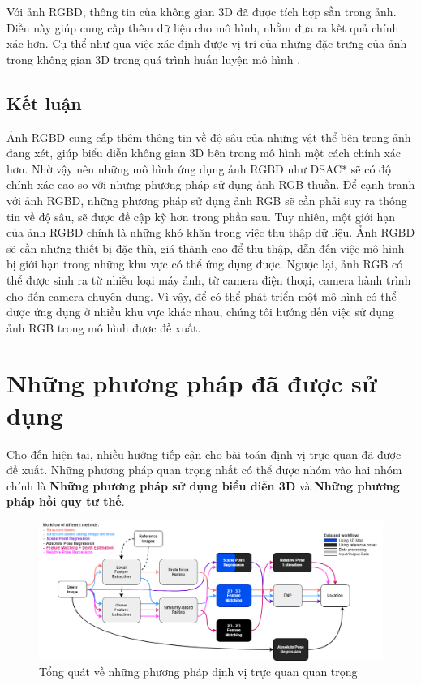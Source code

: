 Với ảnh RGBD, thông tin của không gian 3D đã được tích hợp sẵn trong ảnh. Điều này giúp cung cấp thêm dữ liệu cho mô hình, nhằm đưa ra kết quả chính xác hơn. Cụ thể như qua việc xác định được vị trí của những đặc trưng của ảnh trong không gian 3D trong quá trình huấn luyện mô hình \cite{brachmann2021visual,arnold2022mapfree}.


\subsection{Kết luận}
Ảnh RGBD cung cấp thêm thông tin về độ sâu của những vật thể bên trong ảnh đang xét, giúp biểu diễn không gian 3D bên trong mô hình một cách chính xác hơn. Nhờ vậy nên những mô hình ứng dụng ảnh RGBD như DSAC* \cite{brachmann2021visual} sẽ có độ chính xác cao so với những phương pháp sử dụng ảnh RGB thuần. Để cạnh tranh với ảnh RGBD, những phương pháp sử dụng ảnh RGB sẽ cần phải suy ra thông tin về độ sâu, sẽ được đề cập kỹ hơn trong phần sau. Tuy nhiên, một giới hạn của ảnh RGBD chính là những khó khăn trong việc thu thập dữ liệu. Ảnh RGBD sẽ cần những thiết bị đặc thù, giá thành cao để thu thập, dẫn đến việc mô hình bị giới hạn trong những khu vực có thể ứng dụng được. Ngược lại, ảnh RGB có thể được sinh ra từ nhiều loại máy ảnh, từ camera điện thoại, camera hành trình cho đến camera chuyên dụng. Vì vậy, để có thể phát triển một mô hình có thể được ứng dụng ở nhiều khu vực khác nhau, chúng tôi hướng đến việc sử dụng ảnh RGB trong mô hình được đề xuất.

\section{Những phương pháp đã được sử dụng}

Cho đến hiện tại, nhiều hướng tiếp cận cho bài toán định vị trực quan đã được đề xuất. Những phương pháp quan trọng nhất có thể được nhóm vào hai nhóm chính là \textbf{Những phương pháp sử dụng biểu diễn 3D} và \textbf{Những phương pháp hồi quy tư thế}.

\begin{figure}[H]
    \centering
    \includegraphics[width=\textwidth]{pics/Chapter2/overviewViLoc.png}
    \caption{Tổng quát về những phương pháp định vị trực quan quan trọng \cite{methodsLocal}}
\end{figure}

